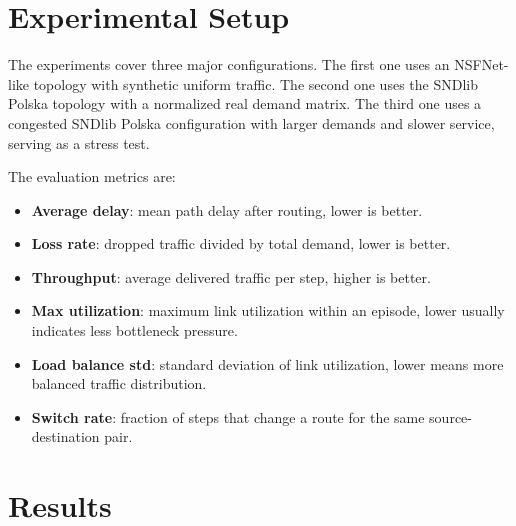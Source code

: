 \documentclass[9pt,a4paper,twocolumn,twoside]{rho-class/rho}
\begin{document}
\section{Experimental Setup}

The experiments cover three major configurations. The first one uses an NSFNet-like topology with synthetic uniform traffic. The second one uses the SNDlib Polska topology with a normalized real demand matrix. The third one uses a congested SNDlib Polska configuration with larger demands and slower service, serving as a stress test.

The evaluation metrics are:

\begin{itemize}
    \item \textbf{Average delay}: mean path delay after routing, lower is better.
    \item \textbf{Loss rate}: dropped traffic divided by total demand, lower is better.
    \item \textbf{Throughput}: average delivered traffic per step, higher is better.
    \item \textbf{Max utilization}: maximum link utilization within an episode, lower usually indicates less bottleneck pressure.
    \item \textbf{Load balance std}: standard deviation of link utilization, lower means more balanced traffic distribution.
    \item \textbf{Switch rate}: fraction of steps that change a route for the same source-destination pair.
\end{itemize}

\section{Results}
\end{document}
